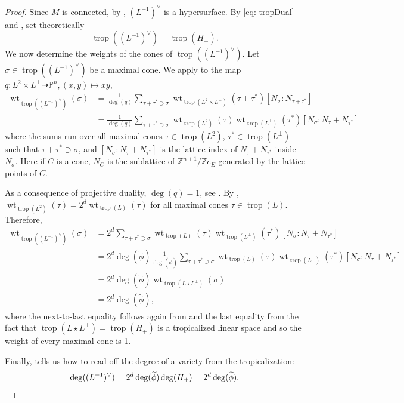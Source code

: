 \documentclass[12pt,a4paper,english]{scrartcl}
\newcommand{\ZZ}{\mathbb{Z}}
\newcommand{\PP}{\mathbb{P}}
\DeclareMathOperator{\weight}{wt}
\DeclareMathOperator{\trop}{trop}
\begin{document}
\begin{proof}
Since $M$ is connected, by , $(L^{-1})^\vee$ is a hypersurface. By \eqref{eq: tropDual} and \cite[Proposition 4.6]{MatsubaraHeoTelen2026}, set-theoretically 
\[
\trop((L^{-1})^\vee) = \trop(H_+).
\]
We now determine the weights of the cones of $ \trop((L^{-1})^\vee)$. Let $\sigma \in \trop((L^{-1})^\vee)$ be a maximal cone. We apply \cite[Theorem 3.12]{sturmfels2007tropical} to the map $q: L^2\times L^\perp \dashrightarrow \PP^n, (x, y) \mapsto x y$,
\begin{align*}
\weight_{\trop((L^{-1})^\vee)}(\sigma)
&= \frac{1}{\deg(q)} \sum_{\tau+\tau^* \supset \sigma} \weight_{\trop(L^2\times L^\perp)}(\tau + \tau^*)[N_\sigma:N_{\tau+\tau^*}]\\
&= \frac{1}{\deg(q)} \sum_{\tau+\tau^* \supset \sigma} \weight_{\trop(L^2)}(\tau)\weight_{\trop(L^\perp)}(\tau^*)[N_\sigma:N_\tau+N_{\tau^*}]
\end{align*}
where the sums run over all maximal cones $\tau \in \trop(L^2)$, $\tau^* \in \trop(L^\perp)$ such that $\tau + \tau^* \supset \sigma$, and $[N_\sigma:N_\tau+N_{\tau^*}]$ is the lattice index of $N_\tau + N_{\tau^*}$ inside $N_\sigma$. Here if $C$ is a cone, $N_C$ is the sublattice of $\ZZ^{n+1}/\ZZ  e_E$ generated by the lattice points of $C$.

As a consequence of projective duality, $\deg(q)= 1$, see \cite[Lemma 4.10]{MatsubaraHeoTelen2026}. By \cite[Lemma 4.9]{MatsubaraHeoTelen2026}, $\weight_{\trop(L^2)}(\tau) = 2^d \weight_{\trop(L)}(\tau)$ for all maximal cones $\tau \in \trop(L)$.
Therefore,
\begin{align*}
\weight_{\trop((L^{-1})^\vee)}(\sigma) &= 2^d \sum_{\tau+\tau^* \supset \sigma} \weight_{\trop(L)}(\tau)\weight_{\trop(L^\perp)}(\tau^*)[N_\sigma:N_\tau+N_{\tau^*}] \\
&= 2^d \deg(\widetilde{\phi}) \frac{1}{\deg(\widetilde{\phi}) }\sum_{\tau+\tau^* \supset \sigma} \weight_{\trop(L)}(\tau)\weight_{\trop(L^\perp)}(\tau^*)[N_\sigma:N_\tau+N_{\tau^*}] \\
&= 2^d \deg(\widetilde{\phi}) \weight_{\trop(L\star L^\perp)}(\sigma) \\
&= 2^d \deg(\widetilde{\phi}),
\end{align*}
where the next-to-last equality follows again from \cite[Theorem 3.12]{sturmfels2007tropical} and the last equality from the fact that $\trop(L\star L^\perp)=\trop(H_+)$ is a tropicalized linear space and so the weight of every maximal cone is 1.

Finally, \cite[Corollary 3.6.16]{Maclagan2015} tells us how to read off the degree of a variety from the tropicalization:
\[
 \deg((L^{-1})^\vee) = 2^d\deg(\widetilde{\phi})\deg(H_+) = 2^d\deg(\widetilde{\phi}). \qedhere
\]
\end{proof}
\end{document}
